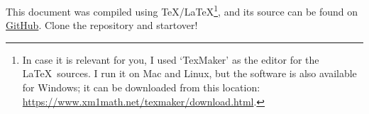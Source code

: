 This document was compiled using \TeX/\LaTeX\footnote{In case it is relevant for you, I used ‘TexMaker’ as the editor for the \LaTeX~sources. I run it on Mac and Linux, but the software is also available for Windows; it can be downloaded from this location: \href{https://www.xm1math.net/texmaker/download.html}{https://www.xm1math.net/texmaker/download.html}.}, and its source can be found on  \href{https://github.com/tquadrat/documents}{GitHub}. Clone the repository and startover!
